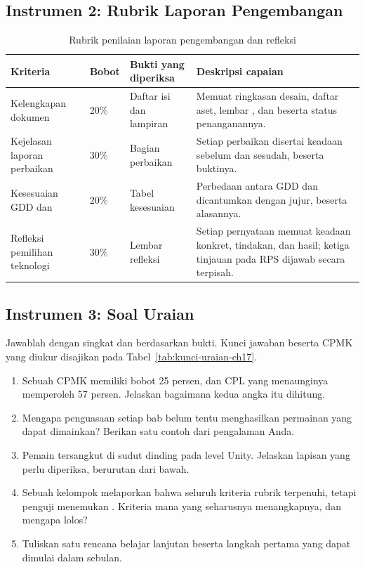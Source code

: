 \subsection*{Instrumen 2: Rubrik Laporan Pengembangan}

\begin{table}[htbp]
\centering
\caption{Rubrik penilaian laporan pengembangan dan refleksi}
\label{tab:rubrik-laporan}
{\setlength{\tabcolsep}{4pt}\footnotesize%
\begin{tabularx}{\textwidth}{@{}L{3.4cm} C{1.3cm} L{3.0cm} Y@{}}
\toprule
\headrow \textbf{Kriteria} & \textbf{Bobot} & \textbf{Bukti yang diperiksa} & \textbf{Deskripsi capaian} \\
\midrule
Kelengkapan dokumen & 20\% & Daftar isi dan lampiran &
Memuat ringkasan desain, daftar aset, lembar , dan
 beserta status penanganannya. \\
\addlinespace
Kejelasan laporan perbaikan & 30\% & Bagian perbaikan &
Setiap perbaikan disertai keadaan sebelum dan sesudah, beserta buktinya. \\
\addlinespace
Kesesuaian GDD dan  & 20\% & Tabel kesesuaian &
Perbedaan antara GDD dan  dicantumkan dengan jujur, beserta
alasannya. \\
\addlinespace
Refleksi pemilihan teknologi & 30\% & Lembar refleksi &
Setiap pernyataan memuat keadaan konkret, tindakan, dan hasil; ketiga tinjauan
pada RPS dijawab secara terpisah. \\
\bottomrule
\end{tabularx}}
\end{table}

\subsection*{Instrumen 3: Soal Uraian}

Jawablah dengan singkat dan berdasarkan bukti. Kunci jawaban beserta CPMK yang
diukur disajikan pada Tabel~\ref{tab:kunci-uraian-ch17}.

\begin{enumerate}
  \item Sebuah CPMK memiliki bobot 25 persen, dan CPL yang menaunginya
        memperoleh 57 persen. Jelaskan bagaimana kedua angka itu dihitung.
  \item Mengapa penguasaan setiap bab belum tentu menghasilkan permainan yang
        dapat dimainkan? Berikan satu contoh dari pengalaman Anda.
  \item Pemain tersangkut di sudut dinding pada level Unity. Jelaskan lapisan
        yang perlu diperiksa, berurutan dari bawah.
  \item Sebuah kelompok melaporkan bahwa seluruh kriteria rubrik terpenuhi,
        tetapi penguji menemukan . Kriteria mana yang
        seharusnya menangkapnya, dan mengapa lolos?
  \item Tuliskan satu rencana belajar lanjutan beserta langkah pertama yang
        dapat dimulai dalam sebulan.
\end{enumerate}

